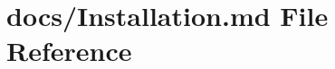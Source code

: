 \hypertarget{Installation_8md}{\section{docs/\+Installation.md File Reference}
\label{Installation_8md}
}
